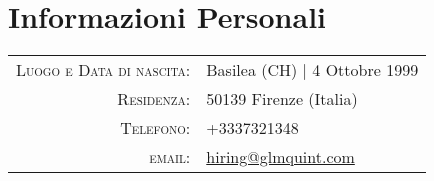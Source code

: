 \documentclass[a4paper,10pt]{article} %
\begin{document}
\pagestyle{fancy} %
\fancyhead{}
\renewcommand{\headrulewidth}{0pt}
\cfoot{}


\par{\bigskip\par} %

\section{Informazioni Personali}

\begin{tabular}{rl}
\textsc{Luogo e Data di nascita:} & Basilea (CH) | 4 Ottobre 1999\\
\textsc{Residenza:} & 50139 Firenze (Italia) \\
\textsc{Telefono:} & +3337321348\\
\textsc{email:} & \href{mailto:hiring@glmquint.com}{hiring@glmquint.com}
\end{tabular}


%
%
%
%
%
\end{document}
